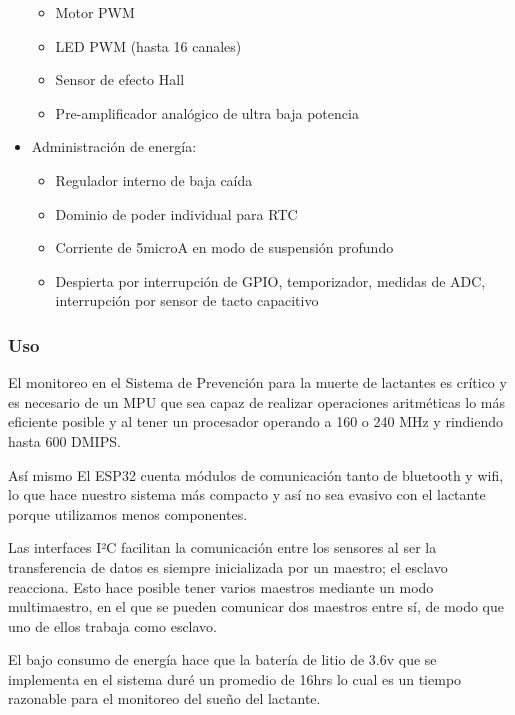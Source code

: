 \begin{itemize}
\begin{itemize}
                    \item Motor PWM
                    \item LED PWM (hasta 16 canales)
                    \item Sensor de efecto Hall
                    \item Pre-amplificador analógico de ultra baja potencia
                \end{itemize}
            \item Administración de energía:
                \begin{itemize}
                    \item Regulador interno de baja caída
                    \item Dominio de poder individual para RTC
                    \item Corriente de 5microA en modo de suspensión profundo
                    \item Despierta por interrupción de GPIO, temporizador, medidas de ADC, interrupción por sensor de tacto capacitivo
                \end{itemize}
        \end{itemize}

    \subsubsection{Uso}
        El monitoreo en el Sistema de Prevención para la muerte de lactantes es crítico y es necesario de un MPU 
        que sea capaz de realizar operaciones aritméticas lo más eficiente posible y al tener un procesador operando 
        a 160 o 240 MHz y rindiendo hasta 600 DMIPS.

        Así mismo El ESP32 cuenta módulos de comunicación tanto de bluetooth y wifi, lo que hace nuestro sistema 
        más compacto y así no sea evasivo con el lactante porque utilizamos menos componentes.

        Las interfaces I²C facilitan la comunicación entre los sensores al ser la transferencia de datos es 
        siempre inicializada por un maestro; el esclavo reacciona. Esto hace posible tener varios maestros mediante 
        un modo multimaestro, en el que se pueden comunicar dos maestros entre sí, de modo que uno de ellos trabaja 
        como esclavo.

        El bajo consumo de energía hace que la batería de litio de 3.6v que se implementa en el sistema duré un
        promedio de 16hrs lo cual es un tiempo razonable para el monitoreo del sueño del lactante.

